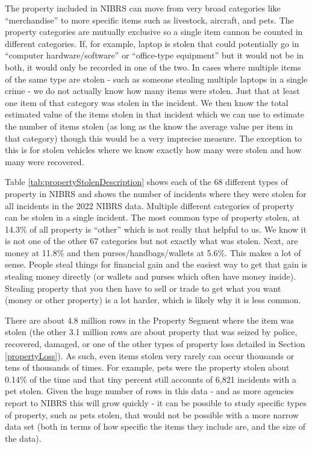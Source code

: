 \documentclass[
]{krantz}
\begin{document}
The property included in NIBRS can move from very broad
categories like ``merchandise'' to more specific items such
as livestock, aircraft, and pets. The property categories
are mutually exclusive so a single item cannon be counted in
different categories. If, for example, laptop is stolen that
could potentially go in ``computer hardware/software'' or
``office-type equipment'' but it would not be in both, it
would only be recorded in one of the two. In cases where
multiple items of the same type are stolen - such as someone
stealing multiple laptops in a single crime - we do not
actually know how many items were stolen. Just that at least
one item of that category was stolen in the incident. We
then know the total estimated value of the items stolen in
that incident which we can use to estimate the number of
items stolen (as long as the know the average value per item
in that category) though this would be a very imprecise
measure. The exception to this is for stolen vehicles where
we know exactly how many were stolen and how many were
recovered.

Table \ref{tab:propertyStolenDescription} shows each of the
68 different types of property in NIBRS and shows the number
of incidents where they were stolen for all incidents in the
2022 NIBRS data. Multiple different categories of property
can be stolen in a single incident. The most common type of
property stolen, at 14.3\% of all property is ``other''
which is not really that helpful to us. We know it is not
one of the other 67 categories but not exactly what was
stolen. Next, are money at 11.8\% and then
purses/handbags/wallets at 5.6\%. This makes a lot of sense.
People steal things for financial gain and the easiest way
to get that gain is stealing money directly (or wallets and
purses which often have money inside). Stealing property
that you then have to sell or trade to get what you want
(money or other property) is a lot harder, which is likely
why it is less common.

There are about 4.8 million rows in the Property Segment
where the item was stolen (the other 3.1 million rows are
about property that was seized by police, recovered,
damaged, or one of the other types of property loss detailed
in Section \ref{propertyLoss}). As such, even items stolen
very rarely can occur thousands or tens of thousands of
times. For example, pets were the property stolen about
0.14\% of the time and that tiny percent still accounts of
6,821 incidents with a pet stolen. Given the huge number of
rows in this data - and as more agencies report to NIBRS
this will grow quickly - it can be possible to study
specific types of property, such as pets stolen, that would
not be possible with a more narrow data set (both in terms of
how specific the items they include are, and the size of the
data).
\end{document}
